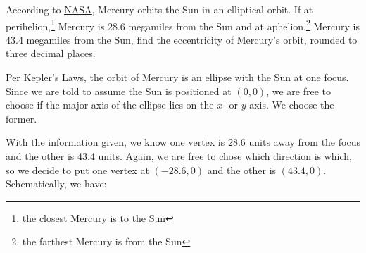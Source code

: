 \documentclass{ximera}
\begin{document}
 

\begin{example}  \label{MecuryOribitEx} According to \href{http://nssdc.gsfc.nasa.gov/planetary/factsheet/planet_table_british.html}{\underline{NASA}}, Mercury orbits the Sun in an elliptical orbit.  If at perihelion,\footnote{the closest Mercury is to the Sun} Mercury is  28.6 megamiles from the Sun and at aphelion,\footnote{the farthest Mercury is from the Sun} Mercury is 43.4 megamiles from the Sun, find the eccentricity of Mercury's orbit, rounded to three decimal places.

 

\begin{explanation}  Per Kepler's Laws, the orbit of Mercury is an ellipse with the Sun at one focus.  Since we are told to assume the Sun is positioned at $(0,0)$, we are free to choose if the major axis of the ellipse lies on the $x$- or $y$-axis.  We choose the former.

 

With the information given, we know one vertex is 28.6 units away from the focus and the other is 43.4 units.  Again, we are free to chose which direction is which, so we decide to put one vertex at $(-28.6, 0)$ and the other is $(43.4, 0)$.  Schematically, we have:

\begin{image}
\end{image}
\end{explanation}
\end{example}
\end{document}
